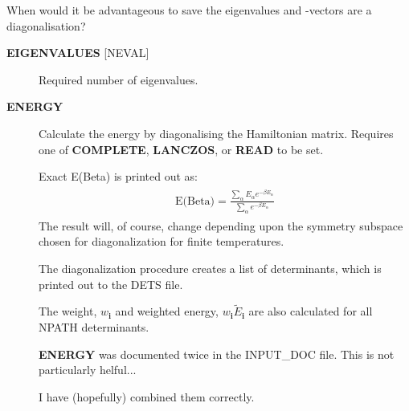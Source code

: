 \documentclass[openany,a4paper,10pt]{manual}
\newcommand{\veci}{\ensuremath{\mathbf{i}}}
\begin{document}
\begin{notice}[note]
When would it be advantageous to save the eigenvalues and -vectors
are a diagonalisation?
\end{notice}
\begin{description}
\item[\textbf{EIGENVALUES} {[}NEVAL{]}]
Required number of eigenvalues.

\item[\textbf{ENERGY}]
Calculate the energy by diagonalising the Hamiltonian matrix.
Requires one of \textbf{COMPLETE}, \textbf{LANCZOS}, or \textbf{READ} to be set.

Exact E(Beta) is printed out as:
\begin{align}\begin{split}\text{E(Beta)} = \frac{ \sum_{\alpha} E_{\alpha} e^{-\beta E_{\alpha}} } { \sum_{\alpha} e^{-\beta E_{\alpha}} }\end{split}\end{align}
The result will, of course, change depending upon the symmetry subspace
chosen for diagonalization for finite temperatures.

The diagonalization procedure creates a list of determinants, which
is printed out to the DETS file.

The weight, $w_{\veci}$ and weighted energy, $w_{\veci}
\tilde{E}_{\veci}$ are also calculated for all NPATH determinants.

\begin{notice}[note]
\textbf{ENERGY} was documented twice in the INPUT\_DOC file.  This is not
particularly helful...

I have (hopefully) combined them correctly.
\end{notice}

\end{description}
\end{document}
